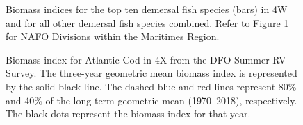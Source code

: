 \documentclass[11pt]{book}
\begin{document}
\begin{figure}[htb]

{\centering {} 

}

\caption{Biomass indices for the top ten demersal fish species (bars) in 4W and for all other demersal fish species combined. Refer to Figure 1 for NAFO Divisions within the Maritimes Region.}\label{fig:7-map-cod}
\end{figure}

\begin{figure}[htb]

{\centering {} 

}

\caption{Biomass index for Atlantic Cod in 4X from the DFO Summer RV Survey. The three-year geometric mean biomass index is represented by the solid black line. The dashed blue and red lines represent 80\% and 40\% of the long-term geometric mean (1970--2018), respectively. The black dots represent the biomass index for that year.}\label{fig:8-fig-cod-biomass4X}
\end{figure}
\end{document}
